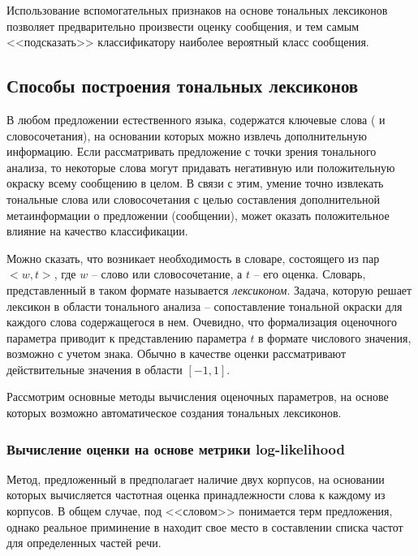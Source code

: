         Использование вспомогательных признаков на основе тональных лексиконов
        позволяет предварительно произвести оценку сообщения, и тем самым
        <<подсказать>> классификатору наиболее вероятный класс сообщения.

    \subsection{Способы построения тональных лексиконов}

    В любом предложении естественного языка, содержатся ключевые слова ( и словосочетания),
    на основании которых можно извлечь дополнительную информацию. Если рассматривать
    предложение с точки зрения тонального анализа, то некоторые слова могут
    придавать негативную или положительную окраску всему сообщению в целом.
    В связи с этим, умение точно извлекать тональные слова или словосочетания
    с целью составления дополнительной метаинформации о предложении (сообщении),
    может оказать положительное влияние на качество классификации.

    Можно сказать, что возникает необходимость в словаре, состоящего из пар
    $<w, t>$, где $w$ -- слово или словосочетание, а $t$ -- его оценка.
    Словарь, представленный в таком формате называется {\it лексиконом}.
    Задача, которую решает лексикон в области тонального анализа -- сопоставление
    тональной окраски для каждого слова содержащегося в нем.
    Очевидно, что формализация оценочного параметра приводит к представлению
    параметра $t$ в формате числового значения, возможно с учетом знака.
    Обычно в качестве оценки рассматривают действительные значения в области
    $\left[ -1, 1\right]$.

    Рассмотрим основные методы вычисления оценочных параметров, на основе которых
    возможно автоматическое создания тональных лексиконов.

        \subsubsection{Вычисление оценки на основе метрики log-likelihood}
        Метод, предложенный в \cite{lexiconLL} предполагает наличие двух корпусов, на основании
        которых вычисляется частотная оценка принадлежности слова к каждому из корпусов.
        В общем случае, под <<словом>> понимается терм предложения, однако
        реальное приминение в \cite{lexiconLL} находит свое место в составлении
        списка частот для определенных частей речи.

